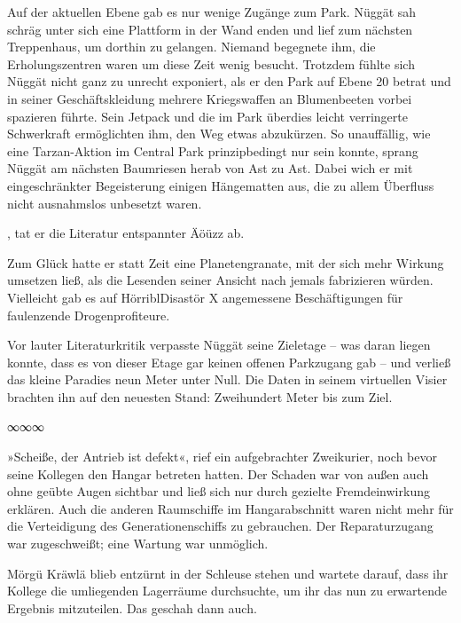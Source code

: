 Auf der aktuellen Ebene gab es nur wenige Zugänge zum Park. Nüggät sah schräg unter sich eine Plattform in der Wand enden und lief zum nächsten Treppenhaus, um dorthin zu gelangen. Niemand begegnete ihm, die Erholungszentren waren um diese Zeit wenig besucht. Trotzdem fühlte sich Nüggät nicht ganz zu unrecht exponiert, als er den Park auf Ebene 20 betrat und in seiner Geschäftskleidung mehrere Kriegswaffen an Blumenbeeten vorbei spazieren führte. Sein Jetpack und die im Park überdies leicht verringerte Schwerkraft ermöglichten ihm, den Weg etwas abzukürzen. So unauffällig, wie eine Tarzan-Aktion im Central Park prinzipbedingt nur sein konnte, sprang Nüggät am nächsten Baumriesen herab von Ast zu Ast. Dabei wich er mit eingeschränkter Begeisterung einigen Hängematten aus, die zu allem Überfluss nicht ausnahmslos unbesetzt waren.

, tat er die Literatur entspannter Äöüzz ab. 

Zum Glück hatte er statt Zeit eine Planetengranate, mit der sich mehr Wirkung umsetzen ließ, als die Lesenden seiner Ansicht nach jemals fabrizieren würden. Vielleicht gab es auf HörriblDisastör X angemessene Beschäftigungen für faulenzende Drogenprofiteure.

Vor lauter Literaturkritik verpasste Nüggät seine Zieletage – was daran liegen konnte, dass es von dieser Etage gar keinen offenen Parkzugang gab – und verließ das kleine Paradies neun Meter unter Null. Die Daten in seinem virtuellen Visier brachten ihn auf den neuesten Stand: Zweihundert Meter bis zum Ziel.

\begin{center}
	∞∞∞
\end{center}

»Scheiße, der Antrieb ist defekt«, rief ein aufgebrachter Zweikurier, noch bevor seine Kollegen den Hangar betreten hatten. Der Schaden war von außen auch ohne geübte Augen sichtbar und ließ sich nur durch gezielte Fremdeinwirkung erklären. Auch die anderen Raumschiffe im Hangarabschnitt waren nicht mehr für die Verteidigung des Generationenschiffs zu gebrauchen. Der Reparaturzugang war zugeschweißt; eine Wartung war unmöglich.

Mörgü Kräwlä blieb entzürnt in der Schleuse stehen und wartete darauf, dass ihr Kollege die umliegenden Lagerräume durchsuchte, um ihr das nun zu erwartende Ergebnis mitzuteilen. Das geschah dann auch.


